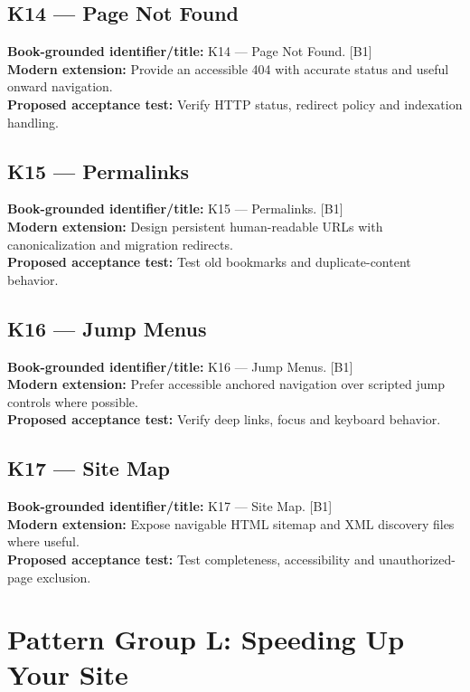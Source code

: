 \documentclass[11pt]{article}
\begin{document}
\subsection{K14 — Page Not Found}
\noindent\textcolor{Ocean}{\textbf{Book-grounded identifier/title:}} K14 — Page Not Found. [B1]\\
\textcolor{Mint}{\textbf{Modern extension:}} Provide an accessible 404 with accurate status and useful onward navigation.\\
\textcolor{Amber}{\textbf{Proposed acceptance test:}} Verify HTTP status, redirect policy and indexation handling.\medskip
\subsection{K15 — Permalinks}
\noindent\textcolor{Ocean}{\textbf{Book-grounded identifier/title:}} K15 — Permalinks. [B1]\\
\textcolor{Mint}{\textbf{Modern extension:}} Design persistent human-readable URLs with canonicalization and migration redirects.\\
\textcolor{Amber}{\textbf{Proposed acceptance test:}} Test old bookmarks and duplicate-content behavior.\medskip
\subsection{K16 — Jump Menus}
\noindent\textcolor{Ocean}{\textbf{Book-grounded identifier/title:}} K16 — Jump Menus. [B1]\\
\textcolor{Mint}{\textbf{Modern extension:}} Prefer accessible anchored navigation over scripted jump controls where possible.\\
\textcolor{Amber}{\textbf{Proposed acceptance test:}} Verify deep links, focus and keyboard behavior.\medskip
\subsection{K17 — Site Map}
\noindent\textcolor{Ocean}{\textbf{Book-grounded identifier/title:}} K17 — Site Map. [B1]\\
\textcolor{Mint}{\textbf{Modern extension:}} Expose navigable HTML sitemap and XML discovery files where useful.\\
\textcolor{Amber}{\textbf{Proposed acceptance test:}} Test completeness, accessibility and unauthorized-page exclusion.\medskip
\section{Pattern Group L: Speeding Up Your Site}
\end{document}
